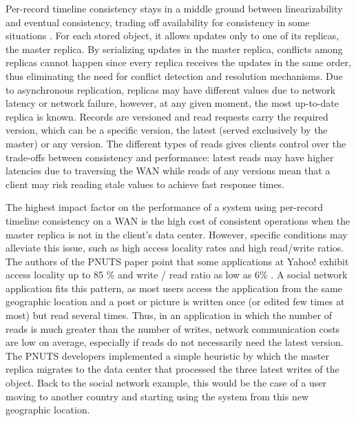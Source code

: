 \documentclass[man,floatsintext,12pt]{apa6}
\begin{document}
Per-record timeline consistency stays in a middle ground between
linearizability \parencite{Herlihy1990} and eventual consistency, trading off
availability for consistency in some situations \parencite{Cooper2008}. For each
stored object, it allows updates only to one of its replicas, the master
replica. By serializing updates in the master replica, conflicts among replicas
cannot happen since every replica receives the updates in the same order, thus
eliminating the need for conflict detection and resolution mechanisms. Due to
asynchronous replication, replicas may have different values due to network
latency or network failure, however, at any given moment, the most up-to-date
replica is known. Records are versioned and read requests carry the required
version, which can be a specific version, the latest (served exclusively by the
master) or any version. The different types of reads gives clients control over
the trade-offs between consistency and performance: latest reads may have higher
latencies due to traversing the WAN while reads of any versions mean that a
client may risk reading stale values to achieve fast response times.

The highest impact factor on the performance of a system using per-record
timeline consistency on a WAN is the high cost of consistent operations when
the master replica is not in the client's data center. However, specific
conditions may alleviate this issue, such as high access locality rates and
high read/write ratios. The authors of the PNUTS paper point that some
applications at Yahoo! exhibit access locality up to 85 \% and write / read
ratio as low as 6\% \parencite{Kadambi2011, Cooper2008}. A social network
application fits this pattern, as most users access the application from the
same geographic location and a post or picture is written once (or edited few
times at most) but read several times. Thus, in an application in which the
number of reads is much greater than the number of writes, network
communication costs are low on average, especially if reads do not necessarily
need the latest version. The PNUTS developers implemented a simple heuristic by
which the master replica migrates to the data center that processed the three
latest writes of the object. Back to the social network example, this would be
the case of a user moving to another country and starting using the system from
this new geographic location.
\end{document}

